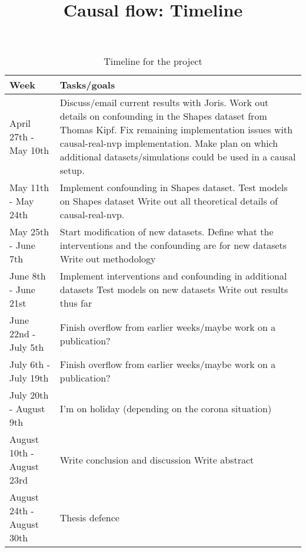 \documentclass{article}
\title{Causal flow: Timeline}
\begin{document}
\begin{table}[]
    \centering
    \begin{tabular}{l|p{10cm}}
        Week & Tasks/goals \\
        \hline
        April 27th - May 10th   &  Discuss/email current results with Joris. \newline Work out details on confounding in the Shapes dataset from Thomas Kipf. \newline Fix remaining implementation issues with causal-real-nvp implementation.  \newline Make plan on which additional datasets/simulations could be used in a causal setup. \\
        \hline
        May 11th - May 24th     & Implement confounding in Shapes dataset. \newline Test models on Shapes dataset \newline Write out all theoretical details of causal-real-nvp. \\
        \hline
        May 25th - June 7th     & Start modification of new datasets. \newline Define what the interventions and the confounding are for new datasets \newline Write out methodology \\
        \hline
        June 8th - June 21st    & Implement interventions and confounding in additional datasets \newline Test models on new datasets \newline Write out results thus far \\
        \hline
        June 22nd - July 5th    & Finish overflow from earlier weeks/maybe work on a publication?\\
        \hline
        July 6th - July 19th    & Finish overflow from earlier weeks/maybe work on a publication?\\
        \hline
        July 20th - August 9th  & I'm on holiday (depending on the corona situation)\\ 
        \hline
        August 10th - August 23rd & Write conclusion and discussion \newline Write abstract \\
        \hline
        August 24th - August 30th & Thesis defence\\
    \end{tabular}
    \caption{Timeline for the project}
\end{table}
\end{document}
